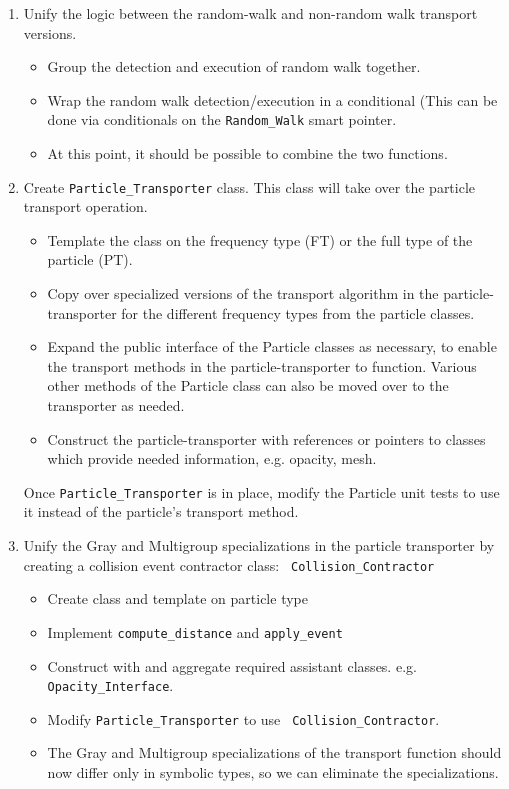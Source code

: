 \documentclass[memo]{ResearchNote}
\begin{document}
\begin{enumerate}
\item Unify the logic between the random-walk and non-random walk
  transport versions. 

  \begin{itemize} 
  \item Group the detection and execution of random walk
    together. 
  \item Wrap the random walk detection/execution in a conditional
    (This can be done via conditionals on the {\tt Random\_Walk} smart
    pointer.
  \item At this point, it should be possible to combine the two
    functions.
  \end{itemize}
  
\item Create {\tt Particle\_Transporter} class. This class will take
  over the particle transport operation.

  \begin{itemize}
  \item Template the class on the frequency type (FT) or the full type
    of the particle (PT).
  \item Copy over specialized versions of the transport algorithm in
    the particle-transporter for the different frequency types from
    the particle classes.
  \item Expand the public interface of the Particle classes as
    necessary, to enable the transport methods in the
    particle-transporter to function. Various other methods of the
    Particle class can also be moved over to the transporter as
    needed.
  \item Construct the particle-transporter with references or pointers
    to classes which provide needed information, e.g. opacity, mesh.
  \end{itemize}

  Once {\tt Particle\_Transporter} is in place, modify the Particle
  unit tests to use it instead of the particle's transport method.
  
\item Unify the Gray and Multigroup specializations in the particle
  transporter by creating a collision event contractor class: {\tt
    Collision\_Contractor}

  \begin{itemize}
    \item Create class and template on particle type
    \item Implement {\tt compute\_distance} and {\tt apply\_event}
    \item Construct with and aggregate required assistant classes.
      e.g.  {\tt Opacity\_Interface}.
    \item Modify {\tt Particle\_Transporter} to use {\tt
        Collision\_Contractor}.
    \item The Gray and Multigroup specializations of the transport
      function should now differ only in symbolic types, so we can
      eliminate the specializations.
    \end{itemize}
    

\end{enumerate}
\end{document}
